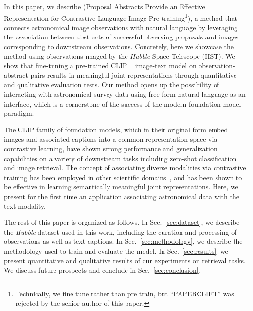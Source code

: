 \documentclass[10pt]{article} %
\newcommand{\SM}[1]{\textcolor{blue}{[SM: #1]}}
\newcommand{\hubble}{\emph{Hubble}\xspace}
\begin{document}
In this paper, we describe  (Proposal Abstracts Provide an Effective Representation for Contrastive Language-Image Pre-training\footnote{Technically, we fine tune rather than pre train, but ``PAPERCLIFT'' was rejected by the senior author of this paper.}), a method that connects astronomical image observations with natural language by leveraging the association between abstracts of successful observing proposals and images corresponding to downstream observations. 
%
Concretely, here we showcase the method using observations imaged by the \hubble Space Telescope (HST).
%
We show that fine-tuning a pre-trained CLIP ~\citep[Contrastive Language-Image Pre-training; ][]{radford2021learning} image-text model on observation-abstract pairs results in meaningful joint representations through quantitative and qualitative evaluation tests.
%
Our method opens up the possibility of interacting with astronomical survey data using free-form natural language as an interface, which is a cornerstone of the success of the modern foundation model paradigm.
%

The CLIP family of foundation models, which in their original form embed images and associated captions into a common representation space via contrastive learning, have shown strong performance and generalization capabilities on a variety of downstream tasks including zero-shot classification and image retrieval.
%
The concept of associating diverse modalities via contrastive training has been employed in other scientific domains~\citep[e.g.,][]{liu2023text,Sanchez-Fernandez2022.11.17.516915,lanusse2023astroclip,cepeda2023geoclip}, and has been shown to be effective in learning semantically meaningful joint representations. Here, we present for the first time an application associating astronomical data with the text modality.


The rest of this paper is organized as follows.
%
In Sec.~\ref{sec:dataset}, we describe the \hubble dataset used in this work, including the curation and processing of observations as well as text captions.
%
In Sec.~\ref{sec:methodology}, we describe the methodology used to train and evaluate the model.
%
In Sec.~\ref{sec:results}, we present quantitative and qualitative results of our experiments on retrieval tasks.
%
We discuss future prospects and conclude in Sec.~\ref{sec:conclusion}.
\end{document}
